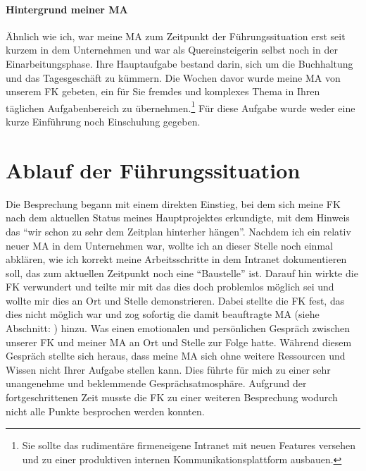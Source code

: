\paragraph*{Hintergrund meiner \ac{MA}}
\label{para:hintergrungMA}
Ähnlich wie ich, war meine \ac{MA} zum Zeitpunkt der Führungssituation erst seit kurzem in dem Unternehmen und war als Quereinsteigerin selbst noch in der  Einarbeitungsphase. 
Ihre Hauptaufgabe bestand darin, sich um die Buchhaltung und das Tagesgeschäft zu kümmern.
Die Wochen davor wurde meine \ac{MA} von unserem \ac{FK} gebeten, ein für Sie fremdes und komplexes Thema in Ihren täglichen Aufgabenbereich zu übernehmen.\footnote{Sie sollte das rudimentäre firmeneigene Intranet mit neuen Features versehen und zu einer produktiven internen Kommunikationsplattform ausbauen.} 
Für diese Aufgabe wurde weder eine kurze Einführung noch Einschulung gegeben.
\begin{comment}
Tagesbesprechung zwischen meiner \ac{MA}\footnote{Diese wurde erst nachträglich zum Gespräch beordert}, unserer \ac{FK} und mir. 

(siehe \cite{Wunderer2011})
\end{comment}


\section{Ablauf der Führungssituation}
\label{subsec:ablauf_situation}
Die Besprechung begann mit einem direkten Einstieg, bei dem sich meine \ac{FK} nach dem aktuellen Status meines Hauptprojektes erkundigte, mit dem Hinweis das "`wir schon zu sehr dem Zeitplan hinterher hängen"'.
Nachdem ich ein relativ neuer \ac{MA} in dem Unternehmen war, wollte ich an dieser Stelle noch einmal abklären, wie ich korrekt meine Arbeitsschritte in dem Intranet dokumentieren soll, das zum aktuellen Zeitpunkt noch eine "`Baustelle"' ist.
Darauf hin wirkte die \ac{FK} verwundert und teilte mir mit das dies doch problemlos möglich sei und wollte mir dies an Ort und Stelle demonstrieren. 
Dabei stellte die \ac{FK} fest, das dies nicht möglich war und zog sofortig die damit beauftragte \ac{MA} (siehe Abschnitt: ) hinzu.
Was einen emotionalen und persönlichen Gespräch zwischen unserer \ac{FK} und meiner \ac{MA} an Ort und Stelle zur Folge hatte. 
Während diesem Gespräch stellte sich heraus, dass meine \ac{MA} sich ohne weitere Ressourcen und Wissen nicht Ihrer Aufgabe stellen kann. 
Dies führte für mich zu einer sehr unangenehme und beklemmende Gesprächsatmosphäre.
Aufgrund der fortgeschrittenen Zeit musste die \ac{FK} zu einer weiteren Besprechung wodurch nicht alle Punkte besprochen werden konnten.

